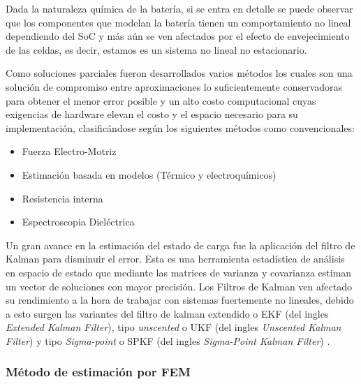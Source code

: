 \documentclass[10pt,a4paper]{article}
\begin{document}
	\noindent Dada la naturaleza química de la batería, si se entra en detalle 
    se puede observar que los componentes que modelan la batería tienen un 
    comportamiento no lineal dependiendo del SoC y más aún se ven afectados por 
    el efecto de envejecimiento de las celdas, es decir, estamos es un sistema 
    no lineal no estacionario.

	\clearpage

	\noindent Como soluciones parciales fueron desarrollados varios métodos los 
    cuales son una solución de compromiso entre aproximaciones lo suficientemente 
    conservadoras para obtener el menor error posible y un alto costo 
    computacional cuyas exigencias de hardware elevan el costo y el espacio 
    necesario para su implementación, clasificándose según \cite{Hannan2017} 
    los siguientes métodos como convencionales:

	\begin{itemize}
		\item Fuerza Electro-Motriz
		\item Estimación basada en modelos (Térmico y electroquímicos)
		\item Resistencia interna
		\item Espectroscopia Dieléctrica
	\end{itemize}
	
	\noindent Un gran avance en la estimación del estado de carga fue la 
    aplicación del filtro de Kalman para disminuir el error. 
    Esta es una herramienta estadística de análisis en espacio de estado que 
    mediante las matrices de varianza y covarianza estiman un vector de 
    soluciones con mayor precisión.
	Los Filtros de Kalman ven afectado su rendimiento a la hora de trabajar con 
    sistemas fuertemente no lineales, debido a esto surgen las variantes del 
    filtro de kalman extendido o EKF (del ingles \emph{Extended Kalman Filter}), 
    tipo \emph{unscented} o UKF (del ingles \emph{Unscented Kalman Filter}) y 
    tipo \emph{Sigma-point} o SPKF (del ingles \emph{Sigma-Point Kalman Filter}) 
    .\\
	
	\subsubsection{Método de estimación por FEM}
\end{document}
